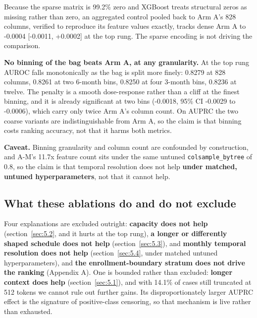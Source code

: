 \documentclass[10pt,twocolumn,letterpaper]{article}
\begin{document}
Because the sparse matrix is 99.2\% zero and XGBoost treats structural zeros as missing rather than zero, an aggregated control pooled back to Arm A's 828 columns, verified to reproduce its feature values exactly, tracks dense Arm A to -0.0004 [-0.0011, +0.0002] at the top rung. The sparse encoding is not driving the comparison.



\textbf{No binning of the bag beats Arm A, at any granularity.} At the top rung AUROC falls monotonically as the bag is split more finely: 0.8279 at 828 columns, 0.8261 at two 6-month bins, 0.8250 at four 3-month bins, 0.8236 at twelve. The penalty is a smooth dose-response rather than a cliff at the finest binning, and it is already significant at two bins (-0.0018, 95\% CI -0.0029 to -0.0006), which carry only twice Arm A's column count. On AUPRC the two coarse variants are indistinguishable from Arm A, so the claim is that binning costs ranking accuracy, not that it harms both metrics.



\textbf{Caveat.} Binning granularity and column count are confounded by construction, and A-M's 11.7x feature count sits under the same untuned \texttt{colsample\_bytree} of 0.8, so the claim is that temporal resolution does not help \textbf{under matched, untuned hyperparameters}, not that it cannot help.



\subsection{What these ablations do and do not exclude}\label{sec:5.5}



Four explanations are excluded outright: \textbf{capacity does not help} (section~\ref{sec:5.2}, and it hurts at the top rung), \textbf{a longer or differently shaped schedule does not help} (section~\ref{sec:5.3}), and \textbf{monthly temporal resolution does not help} (section~\ref{sec:5.4}, under matched untuned hyperparameters), and \textbf{the enrollment-boundary stratum does not drive the ranking} (Appendix A). One is bounded rather than excluded: \textbf{longer context does help} (section~\ref{sec:5.1}), and with 14.1\% of cases still truncated at 512 tokens we cannot rule out further gains. Its disproportionately larger AUPRC effect is the signature of positive-class censoring, so that mechanism is live rather than exhausted.
\end{document}

